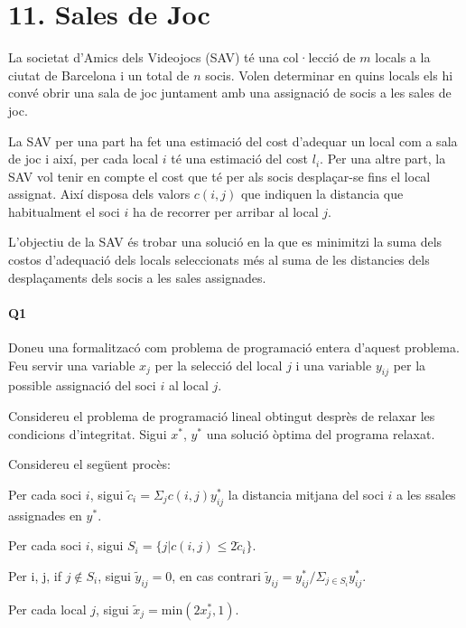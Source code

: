 \section*{11. Sales de Joc}

La societat d'Amics dels Videojocs (SAV) té una col·lecció de $m$  locals a la ciutat de Barcelona i un total de $n$  socis. Volen determinar en quins locals els hi convé obrir una sala de joc juntament amb una assignació de socis a les sales de joc.

La SAV per una part ha fet una estimació del cost d'adequar un local com a sala de joc i així, per cada local $i$ té una estimació del cost $l_i$. Per una altre part, la SAV vol tenir en compte el cost que té per als socis desplaçar-se fins el local assignat. Així disposa dels valors $c(i,j)$ que indiquen la distancia que habitualment el soci $i$ ha de recorrer per arribar al local $j$.

L'objectiu de la SAV és trobar una solució en la que es minimitzi la suma dels costos d'adequació dels locals seleccionats més al suma de les distancies dels desplaçaments dels socis a les sales assignades.

\paragraph{Q1}
Doneu una formalitzacó com problema de programació entera d'aquest problema. Feu servir una variable $x_j$ per la selecció del local $j$ i una variable $y_{ij}$ per la possible assignació del soci $i$ al local $j$.



Considereu el problema de programació lineal obtingut desprès de relaxar les condicions d'integritat. Sigui $x^*$, $y^*$ una solució òptima del programa relaxat.

Considereu el següent procès:
\begin{enumerate}[label=(\alph*)]{
\item Per cada soci $i$, sigui $\tilde{c}_i =  \Sigma_j c(i,j)y^*_{ij} $ la distancia mitjana del soci $i$ a les ssales assignades en $y^*$.
\item Per cada soci $i$, sigui $S_i = \{j | c(i,j) \leq 2\tilde{c}_i\}$.
\item Per i, j, if $j \notin S_i$, sigui $\tilde{y}_{ij} = 0$, en cas contrari $\tilde{y}_{ij} = y^*_{ij}/\Sigma_{j \in S_i} y^*_{ij}$.
\item Per cada local $j$, sigui $\tilde{x}_j = \textrm{min}(2x^*_j, 1)$. 
}

\end{enumerate}

